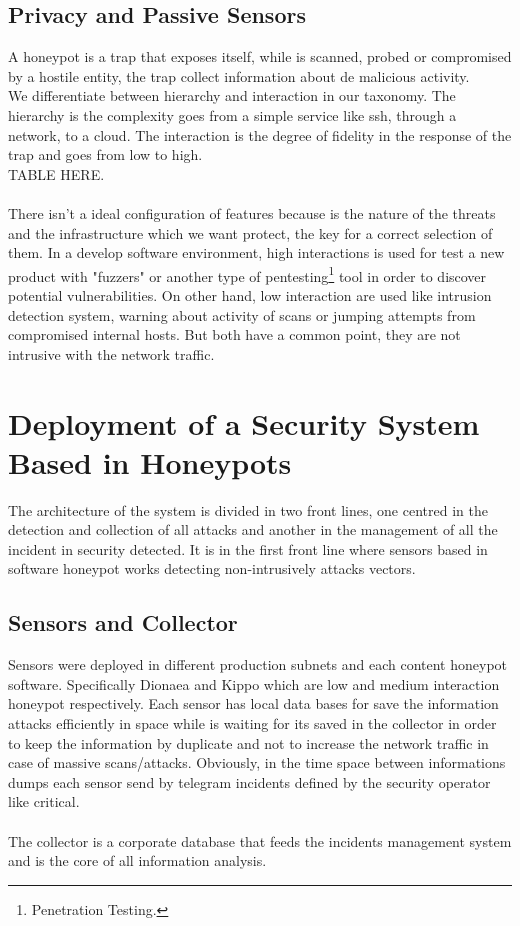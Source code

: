 \documentclass[a4paper]{llncs}
\begin{document}
\subsection{Privacy and Passive Sensors}
\label{sect:Privacy and Passive Sensors}
A honeypot is a trap that exposes itself, while is scanned, probed or compromised by a hostile entity, the trap collect information about de malicious activity.
\\We differentiate between hierarchy and interaction in our taxonomy. The hierarchy is the complexity goes from a simple service like ssh, through a network, to a cloud. The interaction is the degree of fidelity in the response of the trap and goes from low to high.\\TABLE HERE.\\\\There isn't a ideal configuration of features because is the nature of the threats and the infrastructure which we want protect, the key for a correct selection of them. In a develop software environment, high interactions is used for test a new product with "fuzzers" or another type of pentesting\footnote{Penetration Testing.} tool in order to discover potential vulnerabilities. On other hand, low interaction are used like intrusion detection system, warning about activity of scans or jumping attempts from compromised internal hosts. But both have a common point, they are not intrusive with the network traffic.


\section{Deployment of a Security System Based in Honeypots}

The architecture of the system is divided in two front lines, one centred in the detection and collection of all attacks and another in the management of all the incident in security detected. It is in the first front line where sensors based in software honeypot works detecting non-intrusively attacks vectors. 


\subsection{Sensors and Collector}

Sensors were deployed in different production subnets and each content honeypot software. Specifically Dionaea and Kippo which are low and medium interaction honeypot respectively. Each sensor has local data bases for save the information attacks efficiently in space while is waiting for its saved in the collector in order to keep the information by duplicate and not to increase the network traffic in case of massive scans/attacks. Obviously, in the time space between informations dumps each sensor send by telegram incidents  defined by the security operator like critical.\\\\The collector is a corporate database that feeds the incidents management system and is the core of all information analysis.
\end{document}
